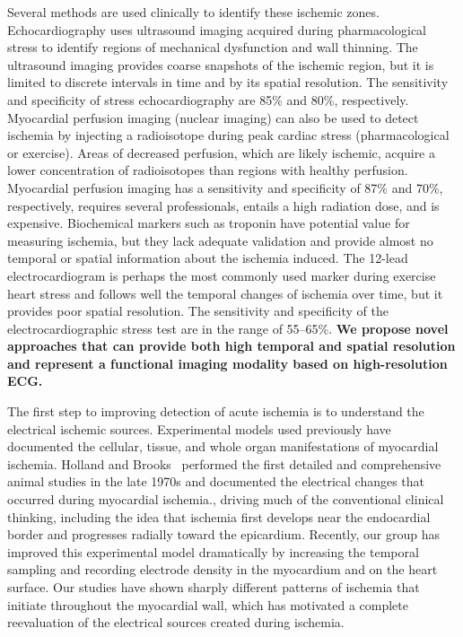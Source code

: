 Several methods are used clinically to identify these ischemic zones. Echocardiography uses ultrasound imaging acquired during pharmacological stress to identify regions of mechanical dysfunction and wall thinning.\cite{BLZ:Man1988,BLZ:Gre1997,KKA:Gel97} The ultrasound imaging provides coarse snapshots of the ischemic region, but it is limited to discrete intervals in time and by its spatial resolution.\cite{BLZ:Saf2018} The sensitivity and specificity of stress echocardiography are 85\% and 80\%, respectively.\cite{BLZ:Knu2018a} Myocardial perfusion imaging (nuclear imaging) can also be used to detect ischemia by injecting a radioisotope during peak cardiac stress (pharmacological or exercise). Areas of decreased perfusion, which are likely ischemic, acquire a lower concentration of radioisotopes than regions with healthy perfusion. Myocardial perfusion imaging has a sensitivity and specificity of 87\% and 70\%, respectively, requires several professionals, entails a high radiation dose, and is expensive.\cite{BLZ:Knu2018a} Biochemical markers such as troponin have potential value for measuring ischemia, but they lack adequate validation and provide almost no temporal or spatial information about the ischemia induced.\cite{BLZ:Saf2018} The 12-lead electrocardiogram is perhaps the most commonly used marker during exercise heart stress and follows well the temporal changes of ischemia over time, but it provides poor spatial resolution. The sensitivity and specificity of the electrocardiographic stress test are in the range of 55--65\%.\cite{BLZ:Knu2018a,RSM:Ste2002} \textbf{We propose novel approaches that can provide both high temporal and spatial resolution and represent a functional imaging modality based on high-resolution ECG.}

The first step to improving detection of acute ischemia is to understand the electrical ischemic sources. Experimental models used previously have documented the cellular, tissue, and whole organ manifestations of myocardial ischemia.\cite{BMB:Hol77a,BMB:Hol77b,BLZ:Kle1978, RSM:Jan80,KKA:Cin80,RSM:Cha89,RSM:Mac95e,RSM:Mac97} Holland and Brooks \etal~performed the first detailed and comprehensive animal studies in the late 1970s and documented the electrical changes that occurred during myocardial ischemia.\cite{BMB:Hol77a,BMB:Hol77b}, driving much of the conventional clinical thinking, including the idea that ischemia first develops near the endocardial border and progresses radially toward the epicardium.\cite{BMB:Hol77a,BMB:Hol77b,BMB:Kat2011} Recently, our group has improved this experimental model dramatically by increasing the temporal sampling and recording electrode density in the myocardium and on the heart surface.\cite{RSM:Sho2007,RSM:Ara2009,RSM:Ara2011, BMB:Ara2015,BMB:Ara2016} Our studies have shown sharply different patterns of ischemia that initiate throughout the myocardial wall, which has motivated a complete reevaluation of the electrical sources created during ischemia.

